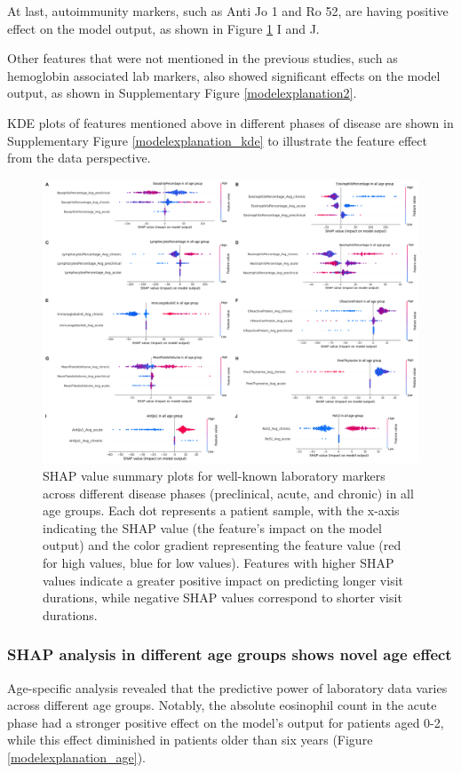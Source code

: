 \documentclass[final,3p,times,authoryear]{elsarticle}
\begin{document}
At last, autoimmunity markers, such as Anti Jo 1 and Ro 52, are having positive effect on the model output, as shown in Figure \ref{modelexplanation} I and J.

Other features that were not mentioned in the previous studies, such as hemoglobin associated lab markers, also showed significant effects on the model output, as shown in Supplementary Figure \ref{modelexplanation2}.

KDE plots of features mentioned above in different phases of disease are shown in Supplementary Figure \ref{modelexplanation_kde} to illustrate the feature effect from the data perspective.

\begin{figure}[t] 
    \centering
    \includegraphics[width=0.8\linewidth]{figures/modelexplanation.png} 
    \caption{SHAP value summary plots for well-known laboratory markers across different disease phases (preclinical, acute, and chronic) in all age groups. Each dot represents a patient sample, with the x-axis indicating the SHAP value (the feature’s impact on the model output) and the color gradient representing the feature value (red for high values, blue for low values). Features with higher SHAP values indicate a greater positive impact on predicting longer visit durations, while negative SHAP values correspond to shorter visit durations.}\label{modelexplanation}
\end{figure}


\subsubsection{SHAP analysis in different age groups shows novel age effect}

Age-specific analysis revealed that the predictive power of laboratory data varies across different age groups. Notably, the absolute eosinophil count in the acute phase had a stronger positive effect on the model’s output for patients aged 0-2, while this effect diminished in patients older than six years (Figure \ref{modelexplanation_age}).
\end{document}
